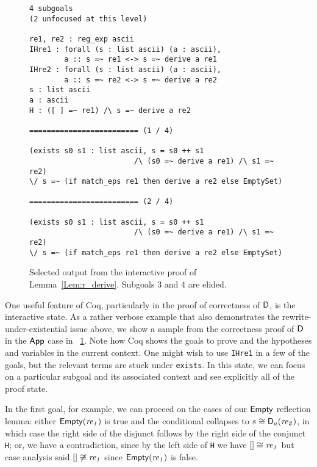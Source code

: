 \begin{figure}[ht]
\begin{verbatim}
4 subgoals
(2 unfocused at this level)

re1, re2 : reg_exp ascii
IHre1 : forall (s : list ascii) (a : ascii),
        a :: s =~ re1 <-> s =~ derive a re1
IHre2 : forall (s : list ascii) (a : ascii),
        a :: s =~ re2 <-> s =~ derive a re2
s : list ascii
a : ascii
H : ([ ] =~ re1) /\ s =~ derive a re2

========================= (1 / 4)

(exists s0 s1 : list ascii, s = s0 ++ s1
                        /\ (s0 =~ derive a re1) /\ s1 =~ re2)
\/ s =~ (if match_eps re1 then derive a re2 else EmptySet)

========================= (2 / 4)

(exists s0 s1 : list ascii, s = s0 ++ s1
                        /\ (s0 =~ derive a re1) /\ s1 =~ re2)
\/ s =~ (if match_eps re1 then derive a re2 else EmptySet)
\end{verbatim}
    \caption{Selected output from the interactive proof of
    Lemma~\ref{Lem:r_derive}. Subgoals 3 and 4 are elided.}\label{F:r_derive}
\end{figure}

One useful feature of Coq, particularly in the proof of correctness of
\(\mathsf{D}\), is the interactive state. As a rather verbose example that also
demonstrates the rewrite-under-existential issue above, we show a sample from the
correctness proof of \(\mathsf{D}\) in the \(\mathsf{App}\) case in
\figurename~\ref{F:r_derive}. Note how Coq shows the goals to prove and the
hypotheses and variables in the current context. One might wish to use
\texttt{IHre1} in a few of the goals, but the relevant terms are stuck under
\texttt{exists}. In this state, we can focus on a particular subgoal and its
associated context and see explicitly all of the proof state.

In the first goal, for example, we can proceed on the cases of our
\(\mathsf{Empty}\) reflection lemma: either \(\mathsf{Empty}(\mathit{re_1})\) is true
and the conditional collapses to \(s \mathrel{\cong} \mathsf{D}_a(\mathit{re_2})\), in which
case the right side of the disjunct follows by the right side of the conjunct
\texttt{H}; or, we have a contradiction, since by the left side of \texttt{H} we have \([]
\mathrel{\cong} \mathit{re_1}\) but case analysis said \([] \not\mathrel{\cong} \mathit{re_1}\)
since \(\mathsf{Empty}(\mathit{re_1})\) is false.

